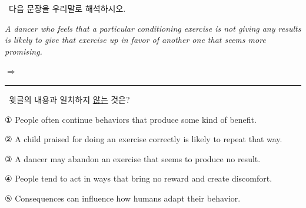 \documentclass[11pt,a4paper]{article}
\newcommand{\qno}[1]{\par\vspace{8pt}\noindent{\sffamily\bfseries #1.}\ }
\newcommand{\instr}[1]{{\sffamily #1}\par\vspace{3pt}}
\begin{document}
\qno{3}\instr{[서술형] 다음 문장을 우리말로 해석하시오.}
\vspace{4pt}\par\noindent
\hspace{1em}\textit{A dancer who feels that a particular conditioning exercise is not giving any results is likely to give that exercise up in favor of another one that seems more promising.}
\par\vspace{6pt}\noindent
$\Rightarrow$ \rule{\linewidth}{0.4pt}

\qno{4}\instr{윗글의 내용과 일치하지 \underline{않는} 것은?}
\begin{choices}
\item ① People often continue behaviors that produce some kind of benefit.
\item ② A child praised for doing an exercise correctly is likely to repeat that way.
\item ③ A dancer may abandon an exercise that seems to produce no result.
\item ④ People tend to act in ways that bring no reward and create discomfort.
\item ⑤ Consequences can influence how humans adapt their behavior.
\end{choices}
\end{document}
